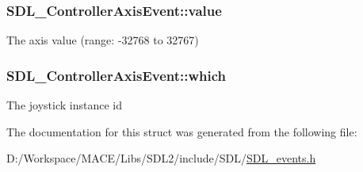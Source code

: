 \subsubsection[{\texorpdfstring{value}{value}}]{ S\+D\+L\+\_\+\+Controller\+Axis\+Event\+::value}\hypertarget{struct_s_d_l___controller_axis_event_a1ed7f14255ed01b982d40a38791d475a}{}\label{struct_s_d_l___controller_axis_event_a1ed7f14255ed01b982d40a38791d475a}
The axis value (range\+: -\/32768 to 32767) 
\subsubsection[{\texorpdfstring{which}{which}}]{ S\+D\+L\+\_\+\+Controller\+Axis\+Event\+::which}\hypertarget{struct_s_d_l___controller_axis_event_a07087f68ea9d64b50047d65312ee7b94}{}\label{struct_s_d_l___controller_axis_event_a07087f68ea9d64b50047d65312ee7b94}
The joystick instance id 

The documentation for this struct was generated from the following file\+:\begin{DoxyCompactItemize}
\item 
D\+:/\+Workspace/\+M\+A\+C\+E/\+Libs/\+S\+D\+L2/include/\+S\+D\+L/\hyperlink{_s_d_l__events_8h}{S\+D\+L\+\_\+events.\+h}\end{DoxyCompactItemize}

